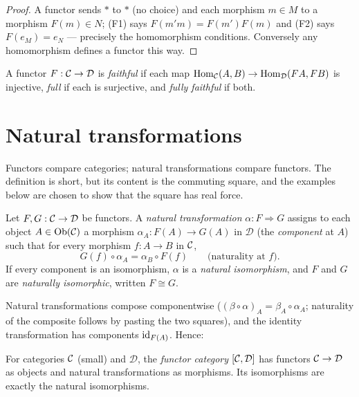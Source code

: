 \begin{proof}
A functor sends $\ast$ to $\ast$ (no choice) and each morphism
$m \in M$ to a morphism $F(m) \in N$; (F1) says
$F(m' m) = F(m') F(m)$ and (F2) says $F(e_M) = e_N$ --- precisely the
homomorphism conditions. Conversely any homomorphism defines a functor
this way.
\end{proof}

\begin{definition}\label{ch02:def:faithful-full}
A functor $F : \mathcal{C} \to \mathcal{D}$ is \emph{faithful} if each map
$\mathrm{Hom}_{\mathcal{C}}(A, B) \to \mathrm{Hom}_{\mathcal{D}}(F A, F B)$ is injective,
\emph{full} if each is surjective, and \emph{fully faithful} if both.
\end{definition}

\section{Natural transformations}\label{ch02:sec:nat}

Functors compare categories; natural transformations compare functors.
The definition is short, but its content is the commuting square, and the
examples below are chosen to show that the square has real force.

\begin{definition}\label{ch02:def:nat}
Let $F, G : \mathcal{C} \to \mathcal{D}$ be functors. A \emph{natural
transformation} $\alpha : F \Rightarrow G$ assigns to each object
$A \in \mathrm{Ob}(\mathcal{C})$ a morphism $\alpha_A : F(A) \to G(A)$ in $\mathcal{D}$
(the \emph{component} at $A$) such that for every morphism
$f : A \to B$ in $\mathcal{C}$,
\[
G(f) \circ \alpha_A = \alpha_B \circ F(f)
\qquad \text{(naturality at } f\text{)}.
\]
If every component is an isomorphism, $\alpha$ is a \emph{natural
isomorphism}, and $F$ and $G$ are \emph{naturally isomorphic}, written
$F \cong G$.
\end{definition}

Natural transformations compose componentwise
($(\beta \circ \alpha)_A = \beta_A \circ \alpha_A$; naturality of the
composite follows by pasting the two squares), and the identity
transformation has components $\mathrm{id}_{F(A)}$. Hence:

\begin{definition}\label{ch02:def:functor-category}
For categories $\mathcal{C}$ (small) and $\mathcal{D}$, the \emph{functor
category} $[\mathcal{C}, \mathcal{D}]$ has functors $\mathcal{C} \to \mathcal{D}$ as
objects and natural transformations as morphisms. Its isomorphisms are
exactly the natural isomorphisms.
\end{definition}

